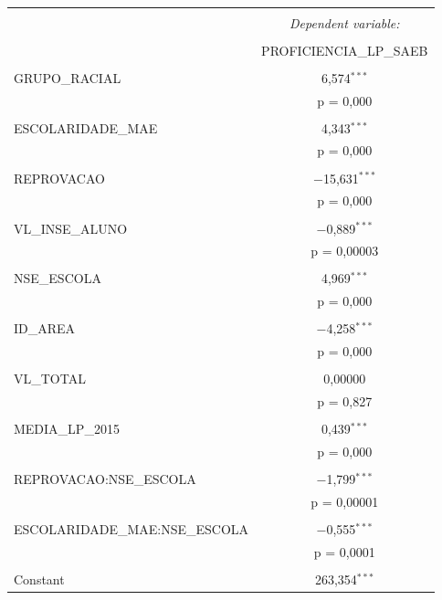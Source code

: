 \begin{table}[!htbp] \centering 
  \caption{} 
  \label{} 
\begin{tabular}{@{\extracolsep{5pt}}lc} 
\\[-1.8ex]\hline 
\hline \\[-1.8ex] 
 & \multicolumn{1}{c}{\textit{Dependent variable:}} \\ 
\cline{2-2} 
\\[-1.8ex] & PROFICIENCIA\_LP\_SAEB \\ 
\hline \\[-1.8ex] 
 GRUPO\_RACIAL & 6,574$^{***}$ \\ 
  & p = 0,000 \\ 
  & \\ 
 ESCOLARIDADE\_MAE & 4,343$^{***}$ \\ 
  & p = 0,000 \\ 
  & \\ 
 REPROVACAO & $-$15,631$^{***}$ \\ 
  & p = 0,000 \\ 
  & \\ 
 VL\_INSE\_ALUNO & $-$0,889$^{***}$ \\ 
  & p = 0,00003 \\ 
  & \\ 
 NSE\_ESCOLA & 4,969$^{***}$ \\ 
  & p = 0,000 \\ 
  & \\ 
 ID\_AREA & $-$4,258$^{***}$ \\ 
  & p = 0,000 \\ 
  & \\ 
 VL\_TOTAL & 0,00000 \\ 
  & p = 0,827 \\ 
  & \\ 
 MEDIA\_LP\_2015 & 0,439$^{***}$ \\ 
  & p = 0,000 \\ 
  & \\ 
 REPROVACAO:NSE\_ESCOLA & $-$1,799$^{***}$ \\ 
  & p = 0,00001 \\ 
  & \\ 
 ESCOLARIDADE\_MAE:NSE\_ESCOLA & $-$0,555$^{***}$ \\ 
  & p = 0,0001 \\ 
  & \\ 
 Constant & 263,354$^{***}$ \\ 

\end{tabular}
\end{table}
